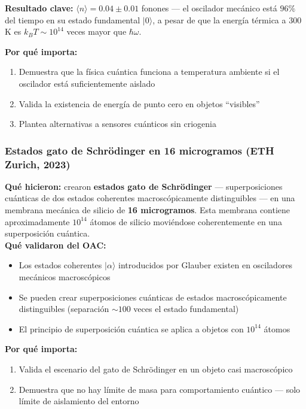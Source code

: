 \documentclass[11pt,a4paper,spanish]{book}
\begin{document}
\textbf{Resultado clave:} $\langle n \rangle = 0.04 \pm 0.01$ fonones — el oscilador mecánico está $96\%$ del tiempo en su estado fundamental $|0\rangle$, a pesar de que la energía térmica a 300 K es $k_B T \sim 10^{14}$ veces mayor que $\hbar\omega$.

\textbf{Por qué importa:} 
\begin{enumerate}
	\item Demuestra que la física cuántica funciona a temperatura ambiente si el oscilador está suficientemente aislado
	\item Valida la existencia de energía de punto cero en objetos ``visibles''
	\item Plantea alternativas a sensores cuánticos sin criogenia
\end{enumerate}

\subsubsection{Estados gato de Schrödinger en 16 microgramos (ETH Zurich, 2023)}

\textbf{Qué hicieron:} \cite{bild2023} crearon \textbf{estados gato de Schrödinger} — superposiciones cuánticas de dos estados coherentes macroscópicamente distinguibles — en una membrana mecánica de silicio de \textbf{16 microgramos}. Esta membrana contiene aproximadamente $10^{14}$ átomos de silicio moviéndose coherentemente en una superposición cuántica.\\

\textbf{Qué validaron del OAC:} 
\begin{itemize}
	\item Los estados coherentes $|\alpha\rangle$ introducidos por Glauber existen en osciladores mecánicos macroscópicos
	\item Se pueden crear superposiciones cuánticas de estados macroscópicamente distinguibles (separación $\sim 100$ veces el estado fundamental)
	\item El principio de superposición cuántica se aplica a objetos con $10^{14}$ átomos
\end{itemize}


\textbf{Por qué importa:} 
\begin{enumerate}
	\item Valida el escenario del gato de Schrödinger en un objeto casi macroscópico
	\item Demuestra que no hay límite de masa para comportamiento cuántico — solo límite de aislamiento del entorno
\end{enumerate}
\end{document}
